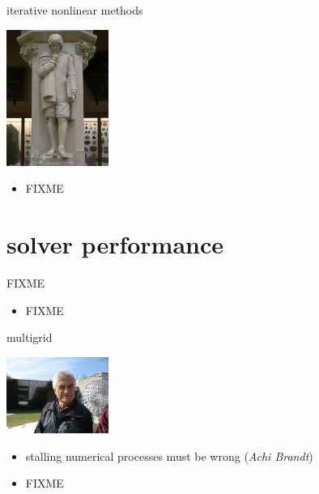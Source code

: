 \documentclass[10pt,hyperref,dvipsnames]{beamer}
\begin{document}
\begin{frame}{iterative nonlinear methods}

\hfill \includegraphics[width=0.25\textwidth]{figs/people/inewton.jpg}

\vspace{-20mm}
\begin{itemize}
\item FIXME
\end{itemize}
\end{frame}


\section{solver performance}

\begin{frame}{FIXME}

\begin{itemize}
\item FIXME
\end{itemize}
\end{frame}

\begin{frame}{multigrid}

\hfill \includegraphics[width=0.25\textwidth]{figs/people/abrandt.jpg}

\begin{itemize}
\item stalling numerical processes must be wrong (\emph{Achi Brandt})
\item FIXME
\end{itemize}
\end{frame}
\end{document}
